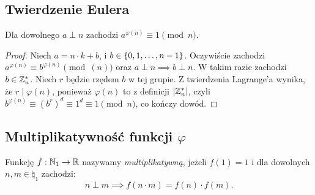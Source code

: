 \subsection{Twierdzenie Eulera}
\begin{theorem}
	\label{nt:phieuler}
	Dla dowolnego \(a \perp n\) zachodzi \(a^{\varphi(n)} \equiv 1 \pmod{n}\).
\end{theorem}
\begin{proof}
	Niech \(a = n \cdot k + b\), i \(b \in \set{0, 1, \ldots, n-1}\). Oczywiście
	zachodzi \(a^{\varphi(n)} \equiv b^{\varphi(n)} \pmod(n)\) oraz \(a \perp n \implies b \perp n\).
	W takim razie zachodzi \(b \in \mathbb{Z}_n^*\). Niech \(r\) będzie rzędem \(b\) w tej grupie.
	Z twierdzenia Lagrange'a wynika, że \(r \mid \varphi(n)\), ponieważ \(\varphi(n)\) to z definicji
	\(\card{\integer_n^*}\), czyli \(b^{\varphi(n)} \equiv (b^r)^{d} \equiv 1^d \equiv 1 \pmod{n}\), co kończy dowód.
\end{proof}

\subsection{Multiplikatywność funkcji \texorpdfstring{\(\varphi\)}{phi}}
\begin{definition}
	Funkcję \(f: \mathbb{N}_1 \to \mathbb{R}\) nazywamy \textit{multiplikatywną}, jeżeli \(f(1) = 1\) i dla dowolnych \(n, m \in \natural_1\) zachodzi:
	\[n \perp m \implies f(n \cdot m) = f(n) \cdot f(m).\]
\end{definition}

